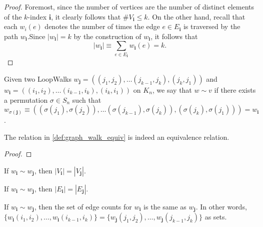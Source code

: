 \begin{proof}
  Foremost, since the number of vertices
  are the number of distinct elements of the $k$-index $\mathbf{i}$, it clearly follows that $\#V_\mathbf{i} \leq k$.
  On the other hand, recall that each $w_i(e)$ denotes the number of times the edge $e \in E_\mathbf{i}$
  is traversed by the path $w_\mathbf{i}$.Since $|w_\mathbf{i}| = k$ by the construction of $w_\mathbf{i}$, it follows that
  \[
  |w_\mathbf{i}| \equiv \sum_{e \in E_\mathbf{i}} w_\mathbf{i}(e) = k.
  \]
\end{proof}


\begin{definition}
  \label{def:graph_walk_equiv}
  Given two LoopWalks $w_{\mathbf{j}} = ((j_1, j_2), \dots (j_{k-1}, j_k), (j_k, j_1))$ and
  $w_{\mathbf{i}}=((i_1, i_2), \dots (i_{k-1}, i_k), (i_k, i_1))$
   on $K_n$, we say that $w \sim v$ if there exists a permutation $\sigma \in S_n$ such that
   $w_{\sigma(\mathbf{j})} \equiv ((\sigma(j_1), \sigma(j_2)), \dots (\sigma(j_{k-1}), \sigma(j_k)), (\sigma(j_{k}), \sigma(j_1)))
   = w_{\mathbf{i}}$.
\end{definition}


\begin{lemma}
  \label{lem:graph_walk_equiv}
  The relation in \ref{def:graph_walk_equiv} is indeed an equivalence relation.
\end{lemma}

\begin{proof}

\end{proof}


\begin{lemma}
  \label{lem:walk_vertex_card_equiv}
  If $w_{\mathbf{i}} \sim w_{\mathbf{j}}$, then $|V_{\mathbf{i}}| = |V_{\mathbf{j}}|$.
\end{lemma}


\begin{lemma}
  \label{lem:walk_edge_card_equiv}
  If $w_{\mathbf{i}} \sim w_{\mathbf{j}}$, then $|E_{\mathbf{i}}| = |E_{\mathbf{j}}|$.
\end{lemma}


\begin{lemma}
  \label{lem:walk_edge_count_equiv}
  If $w_{\mathbf{i}} \sim w_{\mathbf{j}}$, then the set of edge counts for $w_{\mathbf{i}}$ is the
  same as $w_{\mathbf{j}}$. In other words,
  $\{w_{\mathbf{i}}(i_1, i_2) , \dots, w_{\mathbf{i}}(i_{k-1}, i_k)\} =
  \{w_{\mathbf{j}}(j_1, j_2) , \dots, w_{\mathbf{j}}(j_{k-1}, j_k)\}$ as sets.
\end{lemma}


